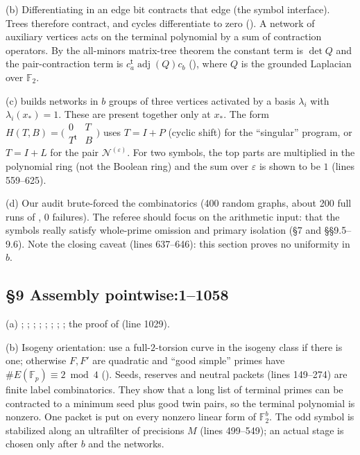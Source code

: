 \documentclass[11pt]{article}
\theoremstyle{remark}
\newcommand{\F}{\mathbb F}
\DeclareMathOperator{\adj}{adj}
\newcommand{\src}[2]{\textsf{\small #1:#2}}
\begin{document}
(b) Differentiating in an edge bit contracts that edge (the symbol
interface). Trees therefore contract, and cycles differentiate to zero
(). A network of auxiliary vertices acts on the terminal
polynomial by a sum of contraction operators. By the all-minors matrix-tree
theorem the constant term is $\det Q$ and the pair-contraction term is
$c_a^{\mathsf t}\adj(Q)c_b$ (), where $Q$ is the grounded
Laplacian over $\F_2$.

(c)  builds networks in $b$ groups of three vertices
activated by a basis $\lambda_i$ with $\lambda_i(x_*)=1$. These are present
together only at $x_*$. The form $H(T,B)=\bigl(\begin{smallmatrix}0&T\\
T^{\mathsf t}&B\end{smallmatrix}\bigr)$ uses $T=I+P$ (cyclic shift) for the
``singular'' program, or $T=I+L$ for the pair $\mathcal N^{(\varepsilon)}$.
For two symbols, the top parts are multiplied in the polynomial ring (not
the Boolean ring) and the sum over $\varepsilon$ is shown to be $1$
(lines 559--625).

(d) Our audit brute-forced the combinatorics (400 random graphs, about 200
full runs of , 0 failures). The referee should focus on the
arithmetic input: that the symbols really satisfy whole-prime omission
and primary isolation (\S7 and \S\S9.5--9.6). Note the closing caveat
(lines 637--646): this section proves no uniformity in $b$.

\subsection*{\S9 Assembly \hfill \src{pointwise}{1--1058}}
(a) ; ; ;
; ; ;
; ; the proof of 
(line 1029).

(b) Isogeny orientation: use a full-$2$-torsion curve in the isogeny class
if there is one; otherwise $F,F'$ are quadratic and ``good simple'' primes
have $\#E(\F_p)\equiv2\bmod4$ (). Seeds, reserves and
neutral packets (lines 149--274) are finite label combinatorics. They show
that a long list of terminal primes can be contracted to a minimum seed
plus good twin pairs, so the terminal polynomial is nonzero. One packet is
put on every nonzero linear form of $\F_2^b$. The odd symbol is stabilized
along an ultrafilter of precisions $M$ (lines 499--549); an actual stage is
chosen only after $b$ and the networks.
\end{document}
